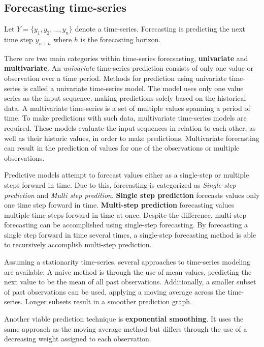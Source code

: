 
\subsection{Forecasting time-series}
\label{section:BT:forecasting-time-series}
Let  $Y = \{y_1, y_2, ..., y_n\}$ denote a time-series.
Forecasting is predicting the next time step $y_{n+h}$ where $h$ is the forecasting horizon.

There are two main categories within time-series forecsasting, \textbf{univariate} and \textbf{multivariate}.
An \textit{univariate} time-series prediction consists of only one value or observation over a time period.
Methods for prediction using univariate time-series is called a univariate time-series model.
The model uses only one value series as the input sequence, making predictions solely based on the historical data.
A multivariate time-series is a set of multiple values spanning a period of time.
To make predictions with such data, multivariate time-series models are required.
These models evaluate the input sequences in relation to each other, as well as their historic values, in order to make predictions.
Multivariate forecasting can result in the prediction of values for one of the observations or multiple observations.


Predictive models attempt to forecast values either as a single-step or multiple steps forward in time.
Due to this, forecasting is categorized as \textit{Single step prediction} and \textit{Multi step predition}.
\textbf{Single step prediction} forecasts values only one time step forward in time.
\textbf{Multi-step prediction} forecasting values multiple time steps forward in time at once.
Despite the difference, multi-step forecasting can be accomplished using single-step forecasting.
By forecasting a single step forward in time several times, a single-step forecasting method is able to recursively accomplish multi-step prediction.


Assuming a stationarity time-series, several approaches to time-series modeling are available.
A naive method is through the use of mean values, predicting the next value to be the mean of all past observations.
Additionally, a smaller subset of past observations can be used, applying a moving average across the time-series.
Longer subsets result in a smoother prediction graph.

Another viable prediction technique is \textbf{exponential smoothing}.
It uses the same approach as the moving average method but differs through the use of
a decreasing weight assigned to each observation.

